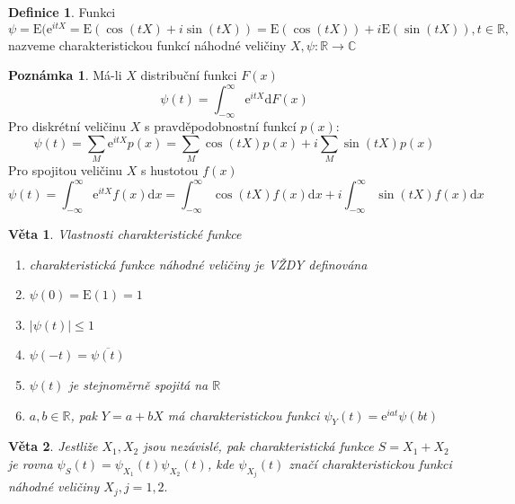 \documentclass[a4]{report}
\newtheorem{theorem}{Věta}
\theoremstyle{definition}
\newtheorem{definition}{Definice}[section]
\newtheorem{notes}{Poznámka}[section]
\begin{document}
{\begin{definition}
Funkci \begin{equation}
\psi =\mathrm{E}(\mathrm{e}^{itX}=\mathrm{E}(\cos(tX)+i\sin(tX))=\mathrm{E}(\cos(tX))+i\mathrm{E}(\sin(tX)), t\in \mathbb{R},
\end{equation}
nazveme charakteristickou funkcí náhodné veličiny $X,\psi:\mathbb{R}\rightarrow\mathbb{C}$
\end{definition}

\begin{notes}
Má-li $X$ distribuční funkci $F(x)$
\begin{equation}
\psi(t)=\int_{-\infty}^{\infty}\mathrm{e}^{itX} \mathrm{d}F(x)
\end{equation}
Pro diskrétní veličinu $X$ s pravděpodobnostní funkcí $p(x)$:
\begin{equation}
\psi(t)=\sum_M \mathrm{e}^{itX}p(x)=\sum_M\cos(tX)p(x)+i\sum_M\sin(tX)p(x)
\end{equation}
Pro spojitou veličinu $X$ s hustotou $f(x)$\begin{equation}
\psi(t)=\int_{-\infty}^{\infty}\mathrm{e}^{itX}f(x) \mathrm{d}x =\int_{-\infty}^{\infty}\cos(tX) f(x) \mathrm{d}x+i\int_{-\infty}^{\infty}\sin(tX) f(x) \mathrm{d}x
\end{equation}
\end{notes}


\begin{theorem}
Vlastnosti charakteristické funkce
\begin{enumerate}
\item charakteristická funkce náhodné veličiny je VŽDY definována
\item $\psi(0)=\mathrm{E}(1)=1$
\item $|\psi(t)| \leq 1$
\item $\psi(-t)=\overline{\psi(t)}$
\item $\psi(t)$ je stejnoměrně spojitá na $\mathbb{R}$
\item $a,b \in \mathbb{R}$, pak $Y=a+bX$ má charakteristickou funkci $\psi_Y(t)=\mathrm{e}^{iat}\psi(bt)$
\end{enumerate}
\end{theorem}

\begin{theorem}
Jestliže $X_1,X_2$ jsou nezávislé, pak charakteristická funkce $S=X_1+X_2$ je rovna $\psi_S(t)=\psi_{X_1}(t)\psi_{X_2}(t)$, kde $\psi_{X_j}(t)$ značí charakteristickou funkci náhodné veličiny $X_j, j=1,2.$
\end{theorem}

}
\end{document}
